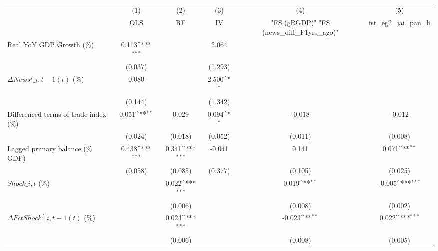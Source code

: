 {
\def\sym#1{\ifmmode^{#1}\else\(^{#1}\)\fi}
\begin{tabular}{l*{5}{c}}
\toprule
                    &\multicolumn{1}{c}{(1)}&\multicolumn{1}{c}{(2)}&\multicolumn{1}{c}{(3)}&\multicolumn{1}{c}{(4)}&\multicolumn{1}{c}{(5)}\\
                    &\multicolumn{1}{c}{OLS}&\multicolumn{1}{c}{RF}&\multicolumn{1}{c}{IV}&\multicolumn{1}{c}{ "FS (gRGDP)"  "FS (news\_diff\_F1yrs\_ago)" }&\multicolumn{1}{c}{fst\_eg2\_jai\_pan\_li}\\
\midrule
Real YoY GDP Growth (\%)&       0.113\sym{***}&                     &       2.064         &                     &                     \\
                    &     (0.037)         &                     &     (1.293)         &                     &                     \\
\addlinespace
$ \Delta News^f\_{i,t-1}(t)$ (\%)&       0.080         &                     &       2.500\sym{*}  &                     &                     \\
                    &     (0.144)         &                     &     (1.342)         &                     &                     \\
\addlinespace
Differenced terms-of-trade index (\%)&       0.051\sym{**} &       0.029         &       0.094\sym{*}  &      -0.018         &      -0.012         \\
                    &     (0.024)         &     (0.018)         &     (0.052)         &     (0.011)         &     (0.008)         \\
\addlinespace
Lagged primary balance (\% GDP)&       0.438\sym{***}&       0.341\sym{***}&      -0.041         &       0.141         &       0.071\sym{**} \\
                    &     (0.058)         &     (0.085)         &     (0.377)         &     (0.105)         &     (0.025)         \\
\addlinespace
$ Shock\_{i,t}$ (\%) &                     &       0.022\sym{***}&                     &       0.019\sym{**} &      -0.005\sym{***}\\
                    &                     &     (0.006)         &                     &     (0.008)         &     (0.002)         \\
\addlinespace
$ \Delta FctShock^f\_{i,t-1}(t)$ (\%)&                     &       0.024\sym{***}&                     &      -0.023\sym{**} &       0.022\sym{***}\\
                    &                     &     (0.006)         &                     &     (0.008)         &     (0.005)         \\

\end{tabular}}
